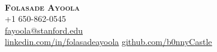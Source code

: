 \documentclass[A4, 11pt]{article}
\begin{document}
\begin{comment}
\end{comment}

\begin{minipage}[c]{0.05\textwidth}
\-\
\end{minipage}


\begin{center}
    \textbf{\Huge \scshape Folasade Ayoola} \\ \vspace{1pt} %
    \small +1 650-862-0545 \\%
    \href{mailto:fayoola@stanford.edu}{\underline{fayoola@stanford.edu}} \\ %
    \href{https://linkedin.com/in/folasadeayoola}{\underline{linkedin.com/in/folasadeayoola}} %
    \href{https://github.com/fizixmastr}{\underline{github.com/b0nnyCastle}}
\end{center}
\end{document}
